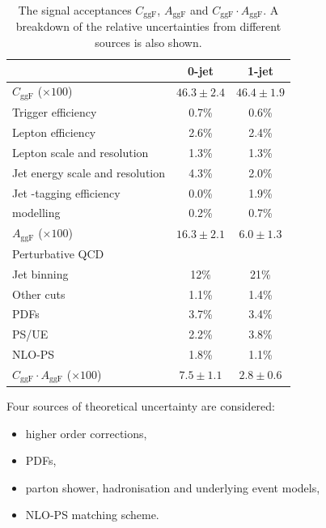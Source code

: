\begin{table}[t]
	\begin{tabular}{l@{}c@{\hskip 0.2in}c}
		\toprule
		& 0-jet & 1-jet \\
		\midrule
		$C_{\text{ggF}}$ ($\times 100$) & $46.3\pm2.4$ & $46.4\pm1.9$ \\
		\quad Trigger efficiency              & 0.7\% & 0.6\% \\
		\quad Lepton efficiency               & 2.6\% & 2.4\% \\
		\quad Lepton \pt scale and resolution & 1.3\% & 1.3\% \\
		\quad Jet energy scale and resolution & 4.3\% & 2.0\% \\
		\quad Jet \Pbottom-tagging efficiency & 0.0\% & 1.9\% \\
		\quad \met modelling                  & 0.2\% & 0.7\% \\
		\cmidrule(lr){1-3}
		$A_{\text{ggF}}$ ($\times 100$) & $16.3\pm2.1$ & $6.0\pm1.3$ \\
		\quad Perturbative QCD \\
		\quad\quad Jet binning & 12\%  & 21\%  \\
		\quad\quad Other cuts  & 1.1\% & 1.4\% \\
		\quad PDFs             & 3.7\% & 3.4\% \\
		\quad PS/UE            & 2.2\% & 3.8\% \\
		\quad NLO-PS           & 1.8\% & 1.1\% \\
		\cmidrule(lr){1-3}
		$C_{\text{ggF}} \cdot A_{\text{ggF}}$ ($\times 100$) & $7.5\pm1.1$ & $2.8\pm0.6$ \\
		\bottomrule
	\end{tabular}
	\caption{The signal acceptances $C_{\text{ggF}}$, $A_{\text{ggF}}$ and $C_{\text{ggF}} 
	\cdot A_{\text{ggF}}$. A breakdown of the relative uncertainties from different sources 
	is also shown.}
	\label{tab:ggF:cggF_aggF}
\end{table}

\newpage
Four sources of theoretical uncertainty are considered:
\begin{itemize}[noitemsep,nolistsep]
	\item higher order corrections,
	\item PDFs,
	\item parton shower, hadronisation and underlying event models,
	\item NLO-PS matching scheme.
\end{itemize}

